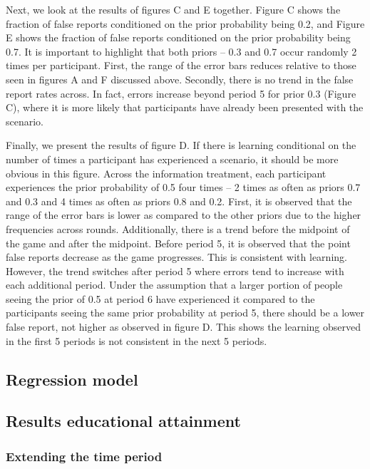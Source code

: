\documentclass[12pt,a4paper]{article}
\begin{document}
	\hspace *{0mm} Next, we look at the results of figures C and E together. Figure C shows the fraction of false reports conditioned on the prior probability being 0.2, and Figure E shows the fraction of false reports conditioned on the prior probability being 0.7. It is important to highlight that both priors – 0.3 and 0.7 occur randomly 2 times per participant. First, the range of the error bars reduces relative to those seen in figures A and F discussed above. Secondly, there is no trend in the false report rates across. In fact, errors increase beyond period 5 for prior 0.3 (Figure C), where it is more likely that participants have already been presented with the scenario.
	
	\hspace *{0mm} Finally, we present the results of figure D. If there is learning conditional on the number of times a participant has experienced a scenario, it should be more obvious in this figure. Across the information treatment, each participant experiences the prior probability of 0.5 four times – 2 times as often as priors 0.7 and 0.3 and 4 times as often as priors 0.8 and 0.2. First, it is observed that the range of the error bars is lower as compared to the other priors due to the higher frequencies across rounds. Additionally, there is a trend before the midpoint of the game and after the midpoint. Before period 5, it is observed that the point false reports decrease as the game progresses. This is consistent with learning. However, the trend switches after period 5 where errors tend to increase with each additional period. Under the assumption that a larger portion of people seeing the prior of 0.5 at period 6 have experienced it compared to the participants seeing the same prior probability at period 5, there should be a lower false report, not higher as observed in figure D. This shows the learning observed in the first 5 periods is not consistent in the next 5 periods. 
	
	\subsection{Regression model}
	
	
	
	\subsection{Results educational attainment}
	
	\subsubsection{Extending the time period}
	
\end{document}
